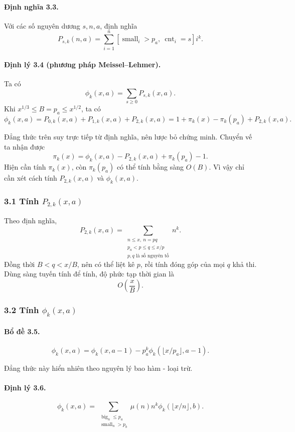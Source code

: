 \documentclass[11pt]{article}
\begin{document}
\paragraph{Định nghĩa 3.3.}
Với các số nguyên dương \(s,n,a\), định nghĩa
\[
  P_{s,k}(n,a)=\sum_{i=1}^{n}
  [\operatorname{small}_i>p_a,\ \operatorname{cnt}_i=s]i^k.
\]

\paragraph{Định lý 3.4 (phương pháp Meissel--Lehmer).}
Ta có
\[
  \phi_k(x,a)=\sum_{s\ge 0}P_{s,k}(x,a).
\]
Khi \(x^{1/3}\le B=p_a\le x^{1/2}\), ta có
\[
  \phi_k(x,a)=P_{0,k}(x,a)+P_{1,k}(x,a)+P_{2,k}(x,a)
  =1+\pi_k(x)-\pi_k(p_a)+P_{2,k}(x,a).
\]

Đẳng thức trên suy trực tiếp từ định nghĩa, nên lược bỏ chứng minh. Chuyển vế
ta nhận được
\[
  \pi_k(x)=\phi_k(x,a)-P_{2,k}(x,a)+\pi_k(p_a)-1.
\]
Hiện cần tính \(\pi_k(x)\), còn \(\pi_k(p_a)\) có thể tính bằng sàng
\(O(B)\). Vì vậy chỉ cần xét cách tính \(P_{2,k}(x,a)\) và \(\phi_k(x,a)\).

\subsubsection*{3.1 Tính \(P_{2,k}(x,a)\)}

Theo định nghĩa,
\[
  P_{2,k}(x,a)=
  \sum_{\substack{n\le x,\ n=pq\\ p_a<p\le q\le x/p\\
  p,q\text{ là số nguyên tố}}}n^k.
\]
Đồng thời \(B<q<x/B\), nên có thể liệt kê \(p\), rồi tính đóng góp của mọi
\(q\) khả thi. Dùng sàng tuyến tính để tính, độ phức tạp thời gian là
\[
  O\left(\frac{x}{B}\right).
\]

\subsubsection*{3.2 Tính \(\phi_k(x,a)\)}

\paragraph{Bổ đề 3.5.}
\[
  \phi_k(x,a)=\phi_k(x,a-1)-p_a^k\phi_k(\lfloor x/p_a\rfloor,a-1).
\]

Đẳng thức này hiển nhiên theo nguyên lý bao hàm - loại trừ.

\paragraph{Định lý 3.6.}
\[
  \phi_k(x,a)=
  \sum_{\substack{\operatorname{big}_n\le p_a\\
  \operatorname{small}_n>p_b}}
  \mu(n)n^k\phi_k(\lfloor x/n\rfloor,b).
\]
\end{document}
